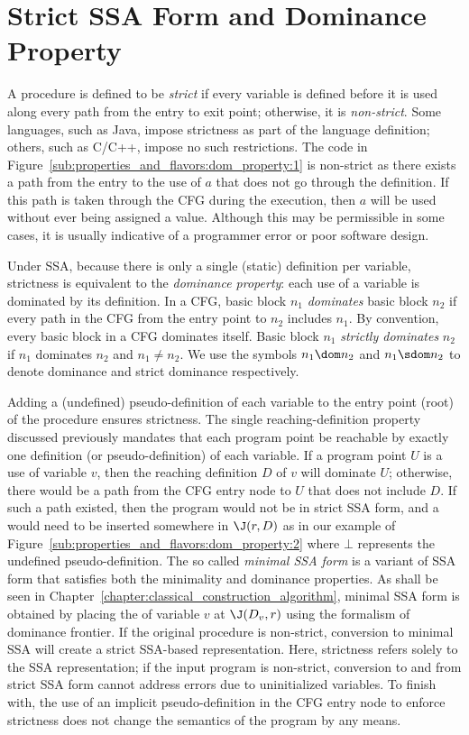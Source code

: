 \section{Strict SSA Form and Dominance Property}
\label{sec:properties_and_flavours:domprop}
A procedure is defined to be \emph{strict} if every variable is defined before it is used along every path from the entry to exit point; 
otherwise, it is \emph{non-strict}. 
Some languages, such as Java, impose strictness as part of the language definition; 
others, such as C/C++, impose no such restrictions. 
The code in Figure~\ref{sub:properties_and_flavors:dom_property:1} is non-strict as there exists a path from the entry to the use of $a$ that does not go through the definition. 
If this path is taken through the CFG during the execution, then $a$ will be used without ever being assigned a value. 
Although this may be permissible in some cases, it is usually indicative of a programmer error or poor software design.

Under SSA, because there is only a single (static) definition per variable, strictness is equivalent to the \emph{dominance property}: 
each use of a variable is dominated by its definition. 
In a CFG, basic block $n_{1}$ \emph{dominates} basic block $n_{2}$ if every path in the CFG from the entry point to $n_{2}$ includes $n_{1}$. 
By convention, every basic block in a CFG dominates itself. 
Basic block $n_{1}$ \emph{strictly dominates} $n_{2}$ if $n_{1}$ dominates $n_{2}$ and $n_{1} \neq n_{2}$. 
We use the symbols $n_{1} \dom n_{2}$ and $n_{1} \sdom n_{2}$ to denote dominance and strict dominance respectively.


Adding a (undefined) pseudo-definition of each variable to the entry point (root) of the procedure ensures strictness. 
The single reaching-definition property discussed previously mandates that each program point be reachable by exactly one definition (or pseudo-definition) of each variable. 
If a program point $U$ is a use of variable $v$, then the reaching definition $D$ of $v$ will dominate $U$; 
otherwise, there would be a path from the CFG entry node to $U$ that does not include $D$. 
If such a path existed, then the program would not be in strict SSA form, and a \phifun would need to be inserted somewhere in $\J(r,D)$ as in our example of Figure~\ref{sub:properties_and_flavors:dom_property:2} where $\bot$ represents the undefined pseudo-definition. 
The so called \emph{minimal SSA form} is a variant of SSA form that satisfies both the minimality and dominance properties. 
As shall be seen in Chapter~\ref{chapter:classical_construction_algorithm}, minimal SSA form is obtained by placing the \phifuns of variable $v$ at $\J(D_v,r)$ using the formalism of dominance frontier. 
If the original procedure is non-strict, conversion to minimal SSA will create a strict SSA-based representation. 
Here, strictness refers solely to the SSA representation; 
if the input program is non-strict, conversion to and from strict SSA form cannot address errors due to uninitialized variables. 
To finish with, the use of an implicit pseudo-definition in the CFG entry node to enforce strictness does not change the semantics of the program by any means.


